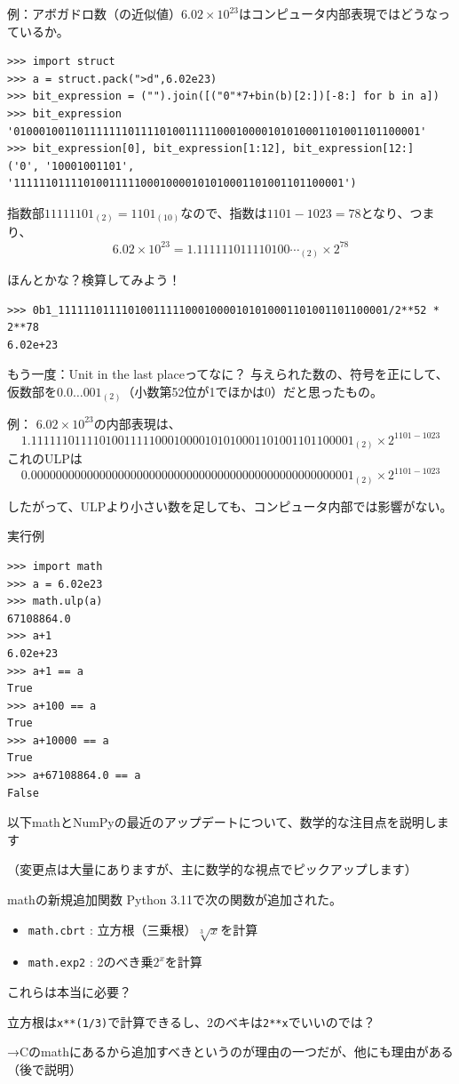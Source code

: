 \documentclass[unicode,lualatex,aspectratio=169]{beamer}
\begin{document}
\begin{frame}[fragile]
  例：アボガドロ数（の近似値）$6.02\times 10^{23}$はコンピュータ内部表現ではどうなっているか。
{\fontsize{6pt}{6pt}\selectfont
\begin{verbatim}
>>> import struct
>>> a = struct.pack(">d",6.02e23) 
>>> bit_expression = ("").join([("0"*7+bin(b)[2:])[-8:] for b in a])
>>> bit_expression
'0100010011011111110111101001111100010000101010001101001101100001'
>>> bit_expression[0], bit_expression[1:12], bit_expression[12:]
('0', '10001001101', '1111110111101001111100010000101010001101001101100001')
\end{verbatim}
}
指数部$11111101_{(2)}=1101_{(10)}$なので、指数は$1101-1023=78$となり、つまり、
\[
  6.02\times 10^{23} = 1.111111011110100\cdots_{(2)} \times 2^{78}
\]

ほんとかな？検算してみよう！
{\fontsize{6pt}{6pt}\selectfont    
\begin{verbatim}
>>> 0b1_1111110111101001111100010000101010001101001101100001/2**52 * 2**78
6.02e+23
\end{verbatim}
}
\end{frame}
\begin{frame}[fragile]{もう一度：Unit in the last placeってなに？}
  与えられた数の、符号を正にして、仮数部を$0.0\dots 001_{(2)}$（小数第52位が1でほかは0）だと思ったもの。

  
  例：
  $6.02\times 10^{23}$の内部表現は、
  {\tiny \[\mathtt{1.1111110111101001111100010000101010001101001101100001}_{(2)} \times 2^{1101-1023}\]}
  これのULPは
  {\tiny \[\mathtt{0.0000000000000000000000000000000000000000000000000001}_{(2)} \times 2^{1101-1023}\]}

  したがって、ULPより小さい数を足しても、コンピュータ内部では影響がない。
\end{frame}
\begin{frame}[fragile]
実行例
{\fontsize{8pt}{8pt}\selectfont
\begin{verbatim}
>>> import math
>>> a = 6.02e23
>>> math.ulp(a)
67108864.0
>>> a+1
6.02e+23
>>> a+1 == a
True
>>> a+100 == a
True
>>> a+10000 == a
True
>>> a+67108864.0 == a
False
\end{verbatim}
}
\end{frame}
\begin{frame}[fragile]
  以下mathとNumPyの最近のアップデートについて、数学的な注目点を説明します
  
  （変更点は大量にありますが、主に数学的な視点でピックアップします）
\end{frame}
\begin{frame}[fragile]{mathの新規追加関数}
  Python 3.11で次の関数が追加された。
  \begin{itemize}
  \item \verb|math.cbrt| : 立方根（三乗根）$\sqrt[3]{x}$を計算
  \item \verb|math.exp2| : 2のべき乗$2^x$を計算
  \end{itemize}
  これらは本当に必要？

  立方根は\verb|x**(1/3)|で計算できるし、2のベキは\verb|2**x|でいいのでは？

  →Cのmathにあるから追加すべきというのが理由の一つだが、他にも理由がある（後で説明）
\end{frame}
\end{document}
